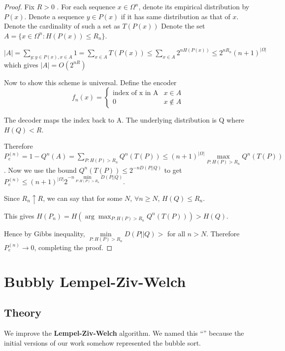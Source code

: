 \documentclass[scrartcl]{article}
\begin{document}
\begin{proof}
Fix $R>0$ . For each sequence $x \in \Omega^n$, denote its empirical distribution by $P(x)$. Denote a sequence $y \in P(x)$ if it has same distribution as that of $x$. Denote the cardinality of such a set as $T(P(x))$
Denote the set $A = \{ x \in \Omega^n : H(P(x))\leq R_n\}$. 

$|A|= \sum\limits_{y: y \in P(x), x \in A} 1 = \sum\limits_{x \in A} T(P(x)) \leq  \sum\limits_{x \in A} 2^{nH(P(x))} \leq 2^{nR_n} (n+1)^{|\Omega|} $ which gives $|A| = O(2^{nR})$ 

Now to show this scheme is universal. Define the encoder 
\[
f_n(x) = \begin{cases} 
 \text{index of x in A} & x \in A \\
 0 & x \notin A
 \end{cases}
\]

The decoder maps the index back to A. The underlying distribution is Q where $H(Q)<R$.  

Therefore $P_e^{(n)} = 1- Q^n(A) = \sum\limits_{P:H(P)>R_n}Q^n(T(P)) \leq (n+1)^{|\Omega|} \max\limits_{P:H(P)>R_n} Q^n(T(P))$. 
Now we use the bound $Q^n(T(P)) \leq 2^{-nD(P||Q)}$ 
to get $P_e^{(n)}\leq (n+1)^{|\Omega|} 2^{ -n \min\limits_{P: H(P)>R_n} D(P||Q)}$.

Since $R_n \uparrow R$, we can say that for some $N$, $\forall n\geq N $, $H(Q)\leq R_n$. 

This gives $ H(P_n) = H(\arg \max_{P:H(P)>R_n} Q^n(T(P))) >H(Q) $.  

Hence by Gibbs inequality, $\min\limits_{P: H(P)>R_n} D(P||Q) >$ for all $n>N$. 
Therefore $P_e^{(n)} \rightarrow 0$, completing the proof. 
\end{proof}

\section{Bubbly Lempel-Ziv-Welch}
\subsection{Theory}
We improve the \textbf{Lempel-Ziv-Welch} algorithm. We named this ``'' because the initial versions of our work somehow represented the bubble sort. 
\end{document}
